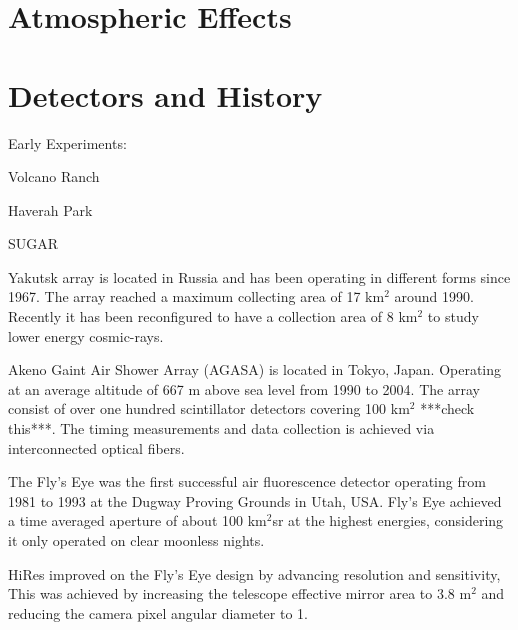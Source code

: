 \section{Atmospheric Effects}




\section{Detectors and History}

Early Experiments:

Volcano Ranch

Haverah Park

SUGAR

Yakutsk array is located in Russia and has been operating in different forms since 1967. The array reached a maximum collecting area of 17 km$^2$ around 1990. Recently it has been reconfigured to have a collection area of 8 km$^2$ to study lower energy cosmic-rays.

Akeno Gaint Air Shower Array (AGASA) is located in Tokyo, Japan. Operating at an average altitude of 667 m above sea level from 1990 to 2004. The array consist of over one hundred scintillator detectors covering 100 km$^2$ ***check this***. The timing measurements and data collection is achieved via interconnected optical fibers.

The Fly's Eye was the first successful air fluorescence detector operating from 1981 to 1993 at the Dugway Proving Grounds in Utah, USA. Fly's Eye achieved a time averaged aperture of about 100 km$^2$sr at the highest energies, considering it only operated on clear moonless nights. 

HiRes improved on the Fly's Eye design by advancing resolution and sensitivity, This was achieved by increasing the telescope effective mirror area to 3.8 m$^2$ and reducing the camera pixel angular diameter to 1\textdegree. 